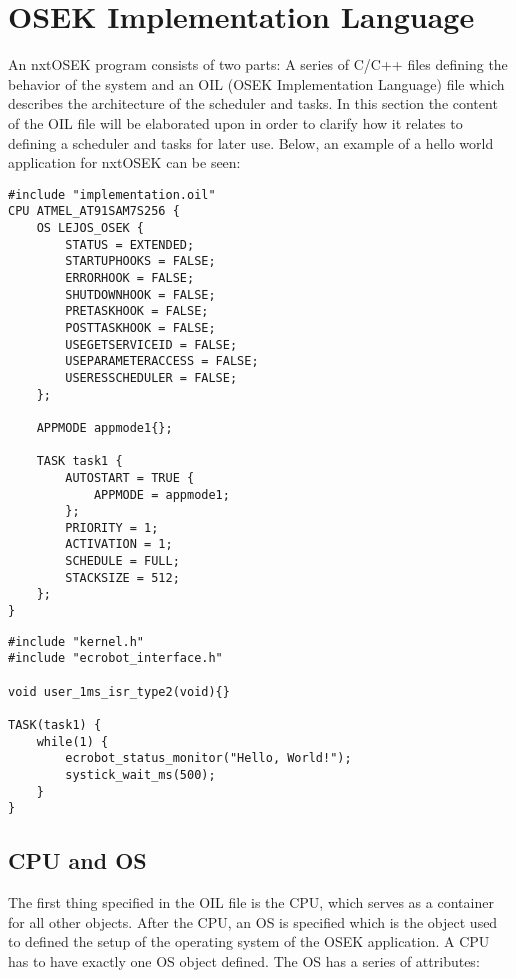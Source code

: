 
\section{OSEK Implementation Language}
An nxtOSEK program consists of two parts: A series of C/C++ files defining the behavior of the system and an OIL (OSEK Implementation Language) file which describes the architecture of the scheduler and tasks.
In this section the content of the OIL file will be elaborated upon in order to clarify how it relates to defining a scheduler and tasks for later use.
Below, an example of a hello world application for nxtOSEK can be seen:
\begin{lstlisting}[caption=OIL]
#include "implementation.oil"
CPU ATMEL_AT91SAM7S256 {
    OS LEJOS_OSEK {
        STATUS = EXTENDED;
        STARTUPHOOKS = FALSE;
        ERRORHOOK = FALSE;
        SHUTDOWNHOOK = FALSE;
        PRETASKHOOK = FALSE;
        POSTTASKHOOK = FALSE;
        USEGETSERVICEID = FALSE;
        USEPARAMETERACCESS = FALSE;
        USERESSCHEDULER = FALSE;
    };

    APPMODE appmode1{};

    TASK task1 {
        AUTOSTART = TRUE {
            APPMODE = appmode1;
        };
        PRIORITY = 1;
        ACTIVATION = 1;
        SCHEDULE = FULL;
        STACKSIZE = 512;
    };
}
\end{lstlisting}

\begin{lstlisting}[caption=C source]
#include "kernel.h"
#include "ecrobot_interface.h"

void user_1ms_isr_type2(void){}

TASK(task1) {
    while(1) {
        ecrobot_status_monitor("Hello, World!");
        systick_wait_ms(500);
    }
}
\end{lstlisting}

\subsection{CPU and OS}
The first thing specified in the OIL file is the CPU, which serves as a container for all other objects\cite{irisa25}.
After the CPU, an OS is specified which is the object used to defined the setup of the operating system of the OSEK application.
A CPU has to have exactly one OS object defined.
The OS has a series of attributes:
